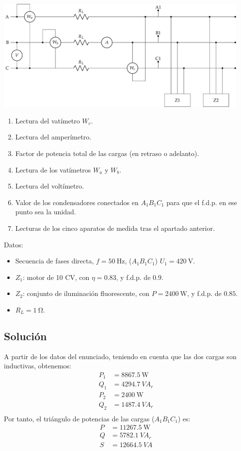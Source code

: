 \begin{center}
  \includegraphics[width=0.95\textwidth]{figuras/BT3_11.pdf}
\end{center}

\begin{enumerate}
\item Lectura del vatímetro $W_c$.
\item Lectura del amperímetro.
\item Factor de potencia total de las cargas (en retraso o
  adelanto).
\item Lectura de los vatímetros $W_a$ y $W_b$.
\item Lectura del voltímetro.
\item Valor de los condensadores conectados en $A_1B_1C_1$ para
  que el f.d.p. en ese punto sea la unidad.
\item Lecturas de los cinco aparatos de medida tras el apartado
  anterior.
\end{enumerate}

Datos:
\begin{itemize}
\item Secuencia de fases directa, $f = \SI{50}{\hertz}$, ($A_1B_1C_1$)
  $U_1 = \SI{420}{\volt}$.
\item $Z_1$: motor de 10 CV, con $\eta = 0.83$, y f.d.p. de $0.9$.
\item $Z_2$: conjunto de iluminación fluorescente, con
  $P = \SI{2400}{\watt}$, y f.d.p. de $0.85$.
\item $R_L = \SI{1}{\ohm}$.
\end{itemize}

\subsection*{Solución}

A partir de los datos del enunciado, teniendo en cuenta que las dos
cargas son inductivas, obtenemos:
\begin{align*}
  P_1 &= \SI{8867.5}{\watt}\\
  Q_1 &= \SI{4294.7}{VA}_r\\
  P_2 &= \SI{2400}{\watt}\\
  Q_2 &= \SI{1487.4}{VA}_r\\
\end{align*}
Por tanto, el triángulo de potencias de las cargas ($A_1B_1C_1$) es:
\begin{align*}
  P &= \SI{11267.5}{\watt}\\
  Q &= \SI{5782.1}{VA}_r\\
  S &= \SI{12664.5}{VA}\\
\end{align*}

